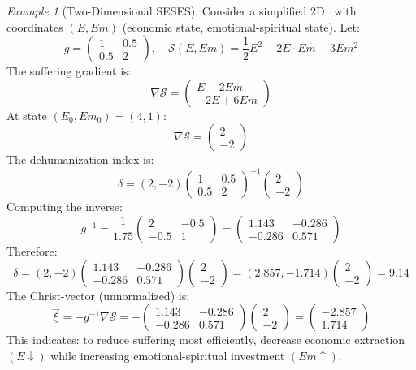 \documentclass[11pt,a4paper]{article}
\theoremstyle{definition}
\theoremstyle{remark}
\newtheorem{example}{Example}[section]
\begin{document}
\begin{example}[Two-Dimensional SESES]
Consider a simplified 2D \SESES\ with coordinates $(E, Em)$ (economic state, emotional-spiritual state). Let:
\[
g = \begin{pmatrix} 1 & 0.5 \\ 0.5 & 2 \end{pmatrix}, \quad
\mathcal{S}(E, Em) = \frac{1}{2}E^2 - 2E \cdot Em + 3Em^2
\]
The suffering gradient is:
\[
\nabla \mathcal{S} = \begin{pmatrix} E - 2Em \\ -2E + 6Em \end{pmatrix}
\]
At state $(E_0, Em_0) = (4, 1)$:
\[
\nabla \mathcal{S} = \begin{pmatrix} 2 \\ -2 \end{pmatrix}
\]
The dehumanization index is:
\[
\delta = (2, -2) \begin{pmatrix} 1 & 0.5 \\ 0.5 & 2 \end{pmatrix}^{-1} \begin{pmatrix} 2 \\ -2 \end{pmatrix}
\]
Computing the inverse:
\[
g^{-1} = \frac{1}{1.75} \begin{pmatrix} 2 & -0.5 \\ -0.5 & 1 \end{pmatrix} = \begin{pmatrix} 1.143 & -0.286 \\ -0.286 & 0.571 \end{pmatrix}
\]
Therefore:
\[
\delta = (2, -2) \begin{pmatrix} 1.143 & -0.286 \\ -0.286 & 0.571 \end{pmatrix} \begin{pmatrix} 2 \\ -2 \end{pmatrix} = (2.857, -1.714) \begin{pmatrix} 2 \\ -2 \end{pmatrix} = 9.14
\]
The Christ-vector (unnormalized) is:
\[
\vec{\xi} = -g^{-1} \nabla \mathcal{S} = -\begin{pmatrix} 1.143 & -0.286 \\ -0.286 & 0.571 \end{pmatrix} \begin{pmatrix} 2 \\ -2 \end{pmatrix} = \begin{pmatrix} -2.857 \\ 1.714 \end{pmatrix}
\]
This indicates: to reduce suffering most efficiently, decrease economic extraction $(E \downarrow)$ while increasing emotional-spiritual investment $(Em \uparrow)$.
\end{example}
\end{document}
